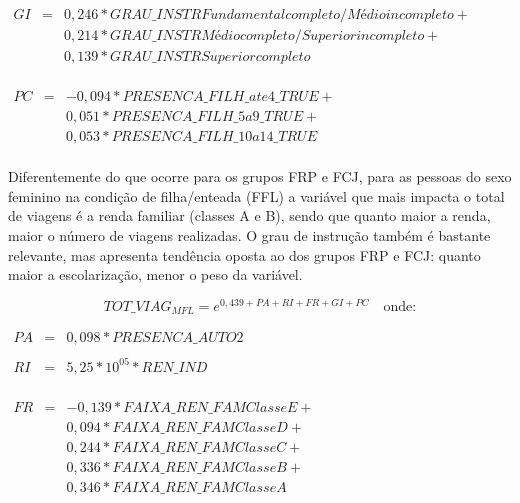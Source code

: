 \begin{math}
\begin{array} {rcl}
GI & = & 0,246*GRAU\_INSTRFundamental completo / Médio incompleto + \\
   &   & 0,214*GRAU\_INSTRMédio completo / Superior incompleto + \\
   &   & 0,139*GRAU\_INSTRSuperior completo \\  
\end{array}
\end{math}

\begin{math}
\begin{array} {rcl}
PC & = & -0,094*PRESENCA\_FILH\_ate4\_TRUE + \\
   &   & 0,051*PRESENCA\_FILH\_5a9\_TRUE +\\
   &   & 0,053*PRESENCA\_FILH\_10a14\_TRUE \\  
\end{array}
\end{math}

Diferentemente do que ocorre para os grupos FRP e FCJ, para as pessoas do sexo feminino na condição de filha/enteada (FFL) a variável que mais impacta o total de viagens é a renda familiar (classes A e B), sendo que quanto maior a renda, maior o número de viagens realizadas.
O grau de instrução também é bastante relevante, mas apresenta tendência oposta ao dos grupos FRP e FCJ: quanto maior a escolarização, menor o peso da variável.

\newpage
\begin{equation}\label{eq:quasi-poisson-GF} 
TOT\_VIAG _{MFL}= e^{0,439 + PA + RI + FR + GI + PC}
\quad \text{onde:}
\end{equation}

\begin{math}
\begin{array} {rcl}
PA & = & 0,098*PRESENCA\_AUTO2 \\  
   &   & \\
RI & = & 5,25*10^{05}*REN\_IND \\  
\end{array}
\end{math}

\begin{math}
\begin{array} {rcl}
FR & = & -0,139*FAIXA\_REN\_FAMClasse E + \\
   &   & 0,094*FAIXA\_REN\_FAMClasse D + \\
   &   & 0,244*FAIXA\_REN\_FAMClasse C + \\
   &   & 0,336*FAIXA\_REN\_FAMClasse B + \\      
   &   & 0,346*FAIXA\_REN\_FAMClasse A \\
\end{array}
\end{math}

